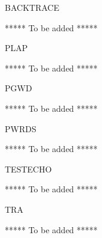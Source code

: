 \begin{Switch}{BACKTRACE}

***** To be added *****

\end{Switch}




\begin{Switch}{PLAP}

***** To be added *****

\end{Switch}


\begin{Switch}{PGWD}

***** To be added *****

\end{Switch}


\begin{Switch}{PWRDS}

***** To be added *****

\end{Switch}


\begin{Switch}{TESTECHO}

***** To be added *****

\end{Switch}


\begin{Switch}{TRA}

***** To be added *****

\end{Switch}


